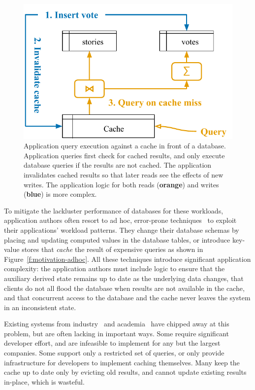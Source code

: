 \begin{figure}
  \centering
  \includegraphics{diagrams/Motivation Ad Hoc Cache.pdf}
  \caption{Application query execution against a cache in front of a database.
  Application queries first check for cached results, and only execute database
  queries if the results are not cached. The application invalidates cached
  results so that later reads see the effects of new writes. The application
  logic for both reads (\textbf{\color{set2}orange}) and writes
  (\textbf{\color{set1}blue}) is more complex.}
  \label{f:motivation-adhoc}
\end{figure}

To mitigate the lackluster performance of databases for these workloads,
application authors often resort to ad hoc, error-prone
techniques~\cite{ad-hoc-caching} to exploit their applications' workload
patterns. They change their database schemas by placing and updating computed
values in the database tables, or introduce key-value stores that \textit{cache}
the result of expensive queries as shown in Figure~\vref{f:motivation-adhoc}.
All these techniques introduce significant application complexity: the
application authors must include logic to ensure that the auxiliary derived
state remains up to date as the underlying data changes, that clients do not all
flood the database when results are not available in the cache, and that
concurrent access to the database and the cache never leaves the system in an
inconsistent state.

Existing systems from industry~\cite{facebook-memcache, tao, flannel} and
academia~\cite{txcache, cachegenie, casql-consistency-thesis, pequod} have
chipped away at this problem, but are often lacking in important ways. Some
require significant developer effort, and are infeasible to implement for any
but the largest companies. Some support only a restricted set of queries, or
only provide infrastructure for developers to implement caching themselves. Many
keep the cache up to date only by evicting old results, and cannot update
existing results in-place, which is wasteful.

